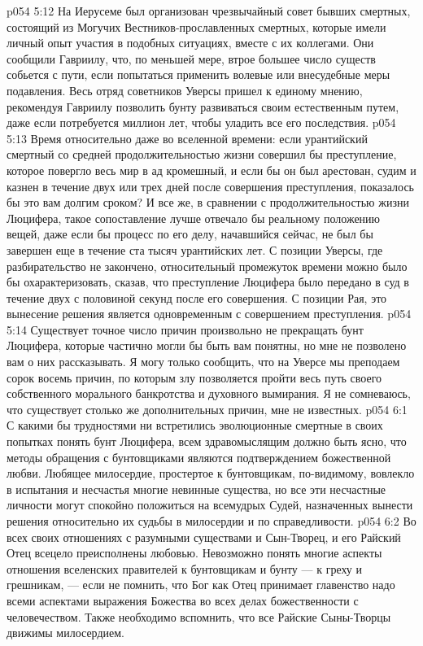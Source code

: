 \vs p054 5:12 \bibnobreakspace На Иерусеме был организован чрезвычайный совет бывших смертных, состоящий из Могучих Вестников\hyp{}прославленных смертных, которые имели личный опыт участия в подобных ситуациях, вместе с их коллегами. Они сообщили Гавриилу, что, по меньшей мере, втрое большее число существ собьется с пути, если попытаться применить волевые или внесудебные меры подавления. Весь отряд советников Уверсы пришел к единому мнению, рекомендуя Гавриилу позволить бунту развиваться своим естественным путем, даже если потребуется миллион лет, чтобы уладить все его последствия.
\vs p054 5:13 \bibnobreakspace Время относительно даже во вселенной времени: если урантийский смертный со средней продолжительностью жизни совершил бы преступление, которое повергло весь мир в ад кромешный, и если бы он был арестован, судим и казнен в течение двух или трех дней после совершения преступления, показалось бы это вам долгим сроком? И все же, в сравнении с продолжительностью жизни Люцифера, такое сопоставление лучше отвечало бы реальному положению вещей, даже если бы процесс по его делу, начавшийся сейчас, не был бы завершен еще в течение ста тысяч урантийских лет. С позиции Уверсы, где разбирательство не закончено, относительный промежуток времени можно было бы охарактеризовать, сказав, что преступление Люцифера было передано в суд в течение двух с половиной секунд после его совершения. С позиции Рая, это вынесение решения является одновременным с совершением преступления.
\vs p054 5:14 \pc Существует точное число причин произвольно не прекращать бунт Люцифера, которые частично могли бы быть вам понятны, но мне не позволено вам о них рассказывать. Я могу только сообщить, что на Уверсе мы преподаем сорок восемь причин, по которым злу позволяется пройти весь путь своего собственного морального банкротства и духовного вымирания. Я не сомневаюсь, что существует столько же дополнительных причин, мне не известных.
\vs p054 6:1 С какими бы трудностями ни встретились эволюционные смертные в своих попытках понять бунт Люцифера, всем здравомыслящим должно быть ясно, что методы обращения с бунтовщиками являются подтверждением божественной любви. Любящее милосердие, простертое к бунтовщикам, по\hyp{}видимому, вовлекло в испытания и несчастья многие невинные существа, но все эти несчастные личности могут спокойно положиться на всемудрых Судей, назначенных вынести решения относительно их судьбы в милосердии и по справедливости.
\vs p054 6:2 Во всех своих отношениях с разумными существами и Сын\hyp{}Творец, и его Райский Отец всецело преисполнены любовью. Невозможно понять многие аспекты отношения вселенских правителей к бунтовщикам и бунту --- к греху и грешникам, --- если не помнить, что Бог как Отец принимает главенство надо всеми аспектами выражения Божества во всех делах божественности с человечеством. Также необходимо вспомнить, что все Райские Сыны\hyp{}Творцы движимы милосердием.
